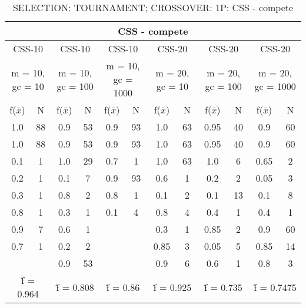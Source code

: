 \begin{table}[H]
	\centering
	\caption{SELECTION: TOURNAMENT; CROSSOVER: 1P: CSS - compete}
	\begin{adjustbox}{width=1\textwidth}
		\begin{tabular}{ |c|c||c|c||c|c||c|c||c|c||c|c| }
			\hline
			\multicolumn{12}{|c|}{CSS - compete} \\
			\hline
			\multicolumn{2}{|c||}{CSS-10} & \multicolumn{2}{c||}{CSS-10} & \multicolumn{2}{c||}{CSS-10} & \multicolumn{2}{c||}{CSS-20} & \multicolumn{2}{c||}{CSS-20} & \multicolumn{2}{c|}{CSS-20}\\
			\hline
			\multicolumn{2}{|c||}{m = 10, gc = 10} & \multicolumn{2}{c||}{m = 10, gc = 100} & \multicolumn{2}{c||}{m = 10, gc = 1000} & \multicolumn{2}{c||}{m = 20, gc = 10} & \multicolumn{2}{c||}{m = 20, gc = 100} & \multicolumn{2}{c|}{m = 20, gc = 1000}\\
			\hline
			f($\bar{x}$) & N & f($\bar{x}$) & N & f($\bar{x}$) & N & f($\bar{x}$) & N & f($\bar{x}$) & N & f($\bar{x}$) & N\\
			\hline
			\hline
			1.0 & 88 & 0.9 & 53 & 0.9 & 93 & 1.0 & 63 & 0.95 & 40 & 0.9 & 60\\
			\hline
			1.0 & 88 & 0.9 & 53 & 0.9 & 93 & 1.0 & 63 & 0.95 & 40 & 0.9 & 60\\
			0.1 & 1 & 1.0 & 29 & 0.7 & 1 & 1.0 & 63 & 1.0 & 6 & 0.65 & 2\\
			0.2 & 1 & 0.1 & 7 & 0.9 & 93 & 0.6 & 1 & 0.2 & 2 & 0.05 & 3\\
			0.3 & 1 & 0.8 & 2 & 0.8 & 1 & 0.1 & 2 & 0.1 & 13 & 0.1 & 8\\
			0.8 & 1 & 0.3 & 1 & 0.1 & 4 & 0.8 & 4 & 0.4 & 1 & 0.4 & 1\\
			0.9 & 7 & 0.6 & 1 &   &   & 0.3 & 1 & 0.85 & 2 & 0.9 & 60\\
			0.7 & 1 & 0.2 & 2 &   &   & 0.85 & 3 & 0.05 & 5 & 0.85 & 14\\
			&   & 0.9 & 53 &   &   & 0.9 & 6 & 0.6 & 1 & 0.8 & 3\\
			\hline
			\multicolumn{2}{|c||}{\^{f} = 0.964} & \multicolumn{2}{c||}{\^{f} = 0.808} & \multicolumn{2}{c||}{\^{f} = 0.86} & \multicolumn{2}{c||}{\^{f} = 0.925} & \multicolumn{2}{c||}{\^{f} = 0.735} & \multicolumn{2}{c|}{\^{f} = 0.7475}\\
			\hline
		\end{tabular}
	\end{adjustbox}
\end{table}
